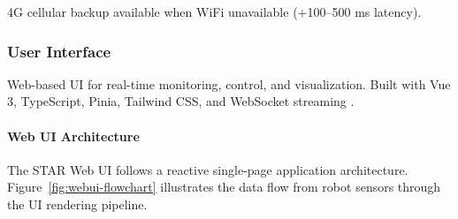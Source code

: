 4G cellular backup available when WiFi unavailable (+100--500 ms latency).

\subsubsection{User Interface}

Web-based UI for real-time monitoring, control, and visualization. Built with Vue 3, TypeScript, Pinia, Tailwind CSS, and WebSocket streaming \parencite{vue3_documentation, typescript_documentation}.

\paragraph{Web UI Architecture}

The STAR Web UI follows a reactive single-page application architecture. Figure~\ref{fig:webui-flowchart} illustrates the data flow from robot sensors through the UI rendering pipeline.

